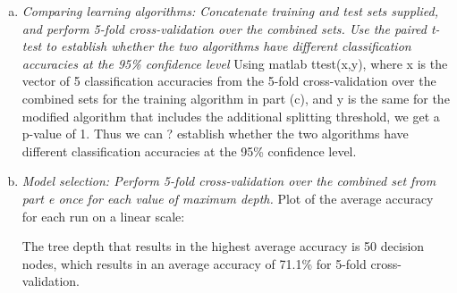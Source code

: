\documentclass{article}
\begin{document}
\begin{enumerate}[(a)]
\item \emph{Comparing learning algorithms: Concatenate training and test sets supplied, and perform 5-fold cross-validation over the combined sets. Use the paired t-test to establish whether the two algorithms have different classification accuracies at the 95\% confidence level} Using matlab ttest(x,y), where x is the vector of 5 classification accuracies from the 5-fold cross-validation over the combined sets for the training algorithm in part (c), and y is the same for the modified algorithm that includes the additional splitting threshold, we get a p-value of 1. Thus we can ? establish whether the two algorithms have different classification accuracies at the 95\% confidence level.
\item \emph{Model selection: Perform 5-fold cross-validation over the combined set from part e once for each value of maximum depth.}
Plot of the average accuracy for each run on a linear scale:


The tree depth that results in the highest average accuracy is 50 decision nodes, which results in an average accuracy of 71.1\% for 5-fold cross-validation.
\end{enumerate}
\end{document}
